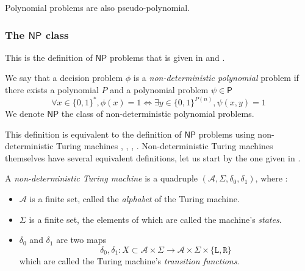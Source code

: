 \begin{proposition}
    Polynomial problems are also pseudo-polynomial.
\end{proposition}

\subsubsection{The $ \mathsf{NP} $ class}

This is the definition of $ \mathsf{NP} $ problems that is given in \cite{gowers2023} and \cite{gowers2024}.

\begin{definition}\label{def:np-problem}
    We say that a decision problem $ \phi $ is a \textit{non-deterministic polynomial} problem if there exists a polynomial $ P $ and a polynomial problem $ \psi \in \mathsf P $
    \[
        \forall x \in \{ 0,1 \}^*, \phi(x) = 1 \iff \exists y \in \{ 0,1 \}^{P(n)}, \psi(x,y) = 1
    \]
    We denote $ \mathsf{NP} $ the class of non-deterministic polynomial problems.
\end{definition}

This definition is equivalent to the definition of $ \mathsf{NP} $ problems using non-deterministic Turing machines \cite{hudry2024}, \cite{charonhudry2019}, \cite{gowers2023}, \cite{gowers2024}. Non-deterministic Turing machines themselves have several equivalent definitions, let us start by the one given in \cite{gowers2024}.

\begin{definition}
    A \textit{non-deterministic Turing machine} is a quadruple \( (\mathcal A, \Sigma, \delta_0, \delta_1 ) \), where :
    \begin{itemize}
        \item $ \mathcal A $ is a finite set, called the \textit{alphabet} of the Turing machine.
        \item $ \Sigma $ is a finite set, the elements of which are called the machine's \textit{states}.
        \item $ \delta_0 $ and $ \delta_1 $ are two maps
        \[
        \delta_0, \delta_1 : X \subset \mathcal A \times \Sigma \to \mathcal A \times \Sigma \times \{ \texttt{L}, \texttt{R}\}
        \]
        which are called the Turing machine's \textit{transition functions}.
    \end{itemize}
\end{definition}

